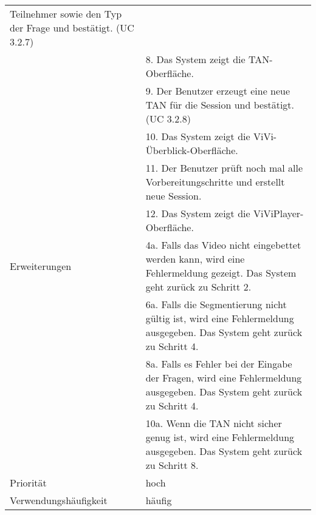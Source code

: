 \begin{tabularx}{\linewidth}{|l|X|}
							  Teilnehmer sowie den Typ der Frage und bestätigt. (UC 3.2.7) \\
							& 8. Das System zeigt die TAN-Oberfläche. \\
							& 9. Der Benutzer erzeugt eine neue TAN für die Session und 
							  bestätigt. (UC 3.2.8) \\ 
							& 10. Das System zeigt die ViVi-Überblick-Oberfläche. \\ 
							& 11. Der Benutzer prüft noch mal alle Vorbereitungschritte und 
							  erstellt neue Session. \\
							& 12. Das System zeigt die ViViPlayer-Oberfläche. \\ \hline
	Erweiterungen			& 4a. Falls das Video nicht eingebettet werden kann, wird eine 
	                          Fehlermeldung gezeigt. Das System geht zurück zu Schritt 2. \\
							& 6a. Falls die Segmentierung nicht gültig ist, wird eine 
							  Fehlermeldung ausgegeben. Das System geht zurück zu Schritt 4.\\
							& 8a. Falls es Fehler bei der Eingabe der Fragen, wird 
							  eine Fehlermeldung ausgegeben. Das System geht zurück zu Schritt 4. \\
							& 10a. Wenn die TAN nicht sicher genug ist, wird eine 
							  Fehlermeldung ausgegeben. Das System geht zurück zu Schritt 8. 
							  \\ \hline
	Priorität				& hoch \\ \hline
	Verwendungshäufigkeit	& häufig \\ \hline
\end{tabularx}